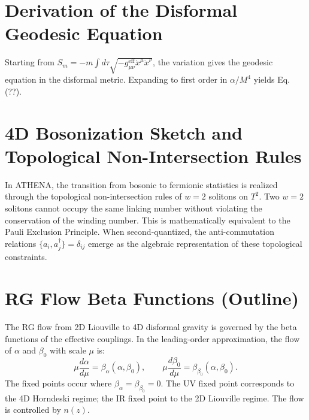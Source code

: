 \documentclass[11pt,a4paper]{article}
\begin{document}
\section{Derivation of the Disformal Geodesic Equation}
Starting from \(S_{m} = - m\int d\tau \sqrt{- g_{\mu \nu}^{\mathrm{eff}}\dot{x}^{\mu}\dot{x}^{\nu}}\), the variation gives the geodesic equation in the disformal metric. Expanding to first order in \(\alpha /M^{4}\) yields Eq. (??).

\section{4D Bosonization Sketch and Topological Non-Intersection Rules}
In ATHENA, the transition from bosonic to fermionic statistics is realized through the topological non-intersection rules of \(w = 2\) solitons on \(T^{2}\). Two \(w = 2\) solitons cannot occupy the same linking number without violating the conservation of the winding number. This is mathematically equivalent to the Pauli Exclusion Principle. When second-quantized, the anti-commutation relations \(\{a_{i},a_{j}^{\dagger}\} = \delta_{ij}\) emerge as the algebraic representation of these topological constraints.

\section{RG Flow Beta Functions (Outline)}
The RG flow from 2D Liouville to 4D disformal gravity is governed by the beta functions of the effective couplings. In the leading-order approximation, the flow of \(\alpha\) and \(\beta_{0}\) with scale \(\mu\) is:
\begin{equation}
\mu \frac{d\alpha}{d\mu} = \beta_{\alpha}(\alpha ,\beta_{0}),\qquad \mu \frac{d\beta_{0}}{d\mu} = \beta_{\beta_{0}}(\alpha ,\beta_{0}). \tag{78}
\end{equation}
The fixed points occur where \(\beta_{\alpha} = \beta_{\beta_{0}} = 0\). The UV fixed point corresponds to the 4D Horndeski regime; the IR fixed point to the 2D Liouville regime. The flow is controlled by \(n(z)\).
\end{document}
